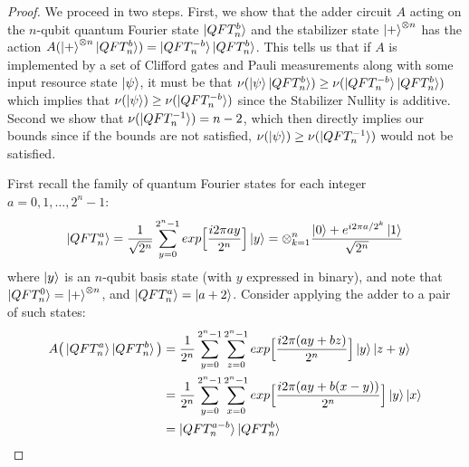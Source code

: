 \documentclass[12pt]{dalthesis}
\begin{document}
\begin{proof}
We proceed in two steps. First, we show that the adder circuit $A$ acting on the $n$-qubit quantum Fourier state $\ket{QFT_n^b}$ and the stabilizer state $\ket{+}^{\otimes n}$ has the action $A(\ket{+}^{\otimes n} \ket{QFT_n^b}) = \ket{QFT_n^{-b}}\ket{QFT_n^b}$. This tells us that if $A$ is implemented by a set of Clifford gates and Pauli measurements along with some input resource state $\ket{\psi}$, it must be that $\nu (\ket{\psi} \ket{QFT_n^b}) \geq \nu(\ket{QFT_n^{-b}} \ket{QFT_n^b})$ which implies that $\nu (\ket{\psi}) \geq \nu(\ket{QFT_n^{-b}})$ since the Stabilizer Nullity is additive. Second we show that $\nu(\ket{QFT_n^{-1}}) = n-2$, which then directly implies our bounds since if the bounds are not satisfied, $\nu(\ket{\psi}) \geq \nu(\ket{QFT_n^{-1}})$ would not be satisfied.

First recall the family of quantum Fourier states for each integer $a = 0, 1, \dots, 2^n - 1$:
\begin{equation}
\label{QFTdef}
\ket{QFT_n^a} = \frac{1}{\sqrt{2^n}} \sum\limits_{y=0}^{2^n-1} exp \Big[ \frac{i2 \pi a y}{2^n} \Big] \ket{y} = \otimes_{k=1}^n \frac{\ket{0} + e^{i2\pi a/2^k} \ket{1}}{\sqrt{2^n}}
\end{equation}
where $\ket{y}$ is an $n$-qubit basis state (with $y$ expressed in binary), and note that $\ket{QFT_n^0} = \ket{+}^{\otimes n}$, and $\ket{QFT_n^a} = \ket{a + 2}$. Consider applying the adder to a pair of such states:
\begin{equation}
\begin{split}
A \big(\ket{QFT_n^a} \ket{QFT_n^b} \big) & = \frac{1}{2^n} \sum\limits_{y=0}^{2^n-1} \sum\limits_{z=0}^{2^n-1} exp \Big[ \frac{i2 \pi (ay + bz)}{2^n} \Big] \ket{y}\ket{z+y} \\
& = \frac{1}{2^n} \sum\limits_{y=0}^{2^n-1} \sum\limits_{x=0}^{2^n-1} exp \Big[ \frac{i2 \pi (ay + b(x-y))}{2^n} \Big] \ket{y}\ket{x} \\
& = \ket{QFT_n^{a-b}}\ket{QFT_n^b}
\end{split}
\end{equation}


\end{proof}
\end{document}
